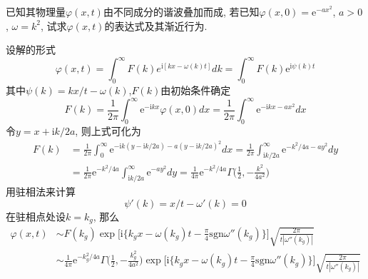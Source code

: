 \begin{problem}[习题3.4]
已知其物理量$\varphi(x,t)$由不同成分的谐波叠加而成, 若已知$\varphi(x,0)=\mathrm{e}^{-ax^2}$, $a>0$, $\omega=k^2$, 试求$\varphi(x,t)$的表达式及其渐近行为.
\end{problem}

\begin{solution}
设解的形式
\[
\varphi(x,t)=\int_{0}^{\infty}F(k)e^{\mathrm{i}[kx-\omega(k)t]}dk=\int_{0}^{\infty}F(k)\mathrm{e}^{\mathrm{i}\psi(k)t}
\]
其中$\psi(k)=kx/t-\omega(k)$,$F(k)$由初始条件确定
\[
F(k)=\frac{1}{2\pi}\int_{0}^{\infty}\mathrm{e}^{-\mathrm{i}kx}\varphi(x,0)dx=\frac{1}{2\pi}\int_{0}^{\infty}\mathrm{e}^{-\mathrm{i}kx-ax^{2}}dx
\]
令$y=x+\mathrm{i}k/2a$, 则上式可化为
\begin{align*}
F(k) & =\frac{1}{2\pi}\int_{0}^{\infty}\mathrm{e}^{-\mathrm{i}k(y-\mathrm{i}k/2a)-a(y-\mathrm{i}k/2a)^{2}}dx=\frac{1}{2\pi}\int_{\mathrm{i}k/2a}^{\infty}\mathrm{e}^{-k^{2}/4a-ay^{2}}dy\\
 & =\frac{1}{2\pi}\mathrm{e}^{-k^{2}/4a}\int_{\mathrm{i}k/2a}^{\infty}\mathrm{e}^{-ay^{2}}dy=\frac{1}{4\pi}\mathrm{e}^{-k^{2}/4a}\Gamma\Big(\frac{1}{2},-\frac{k^{2}}{4a^{2}}\Big)
\end{align*}
用驻相法来计算
\[
\psi'(k)=x/t-\omega'(k)=0
\]
在驻相点处设$k=k_{g}$, 那么
\begin{align*}
\varphi(x,t) & \sim F(k_{g})\exp\bigg[\mathrm{i}\bigg\{ k_{g}x-\omega(k_{g})t-\frac{\pi}{4}\mathrm{sgn}\omega''(k_{g})\bigg\}\bigg]\sqrt{\frac{2\pi}{t|\omega''(k_{g})|}}\\
 & \sim\frac{1}{4\pi}\mathrm{e}^{-k_{g}^{2}/4a}\Gamma\Big(\frac{1}{2},-\frac{k_{g}^{2}}{4a^{2}}\Big)\exp\bigg[\mathrm{i}\bigg\{ k_{g}x-\omega(k_{g})t-\frac{\pi}{4}\mathrm{sgn}\omega''(k_{g})\bigg\}\bigg]\sqrt{\frac{2\pi}{t|\omega''(k_{g})|}}
\end{align*}
\end{solution}
